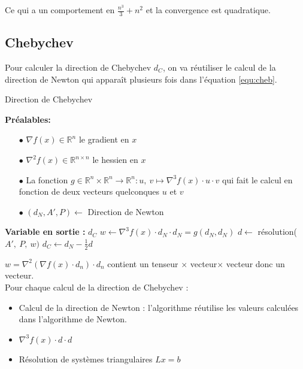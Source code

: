 Ce qui a un comportement en $\frac{n^3}{3}+n^2$ et la convergence est quadratique.


\subsection{Chebychev}

Pour calculer la direction de Chebychev $d_C$, on va r\'eutiliser le calcul
de la direction de Newton qui apparaît plusieurs fois dans l'\'equation \eqref{equ:cheb}. %

\begin{algorithm}                     %
\caption{Direction de Chebychev}          %
\label{alg:3}                           %
\begin{algorithmic}
\STATE \textbf{Pr\'ealables:} %
\begin{itemize}
\item[$\bullet$] $\nabla f(x)\in \mathbb{R}^n$ le gradient en $x$
\item[$\bullet$] $\nabla^2 f(x)\in \mathbb{R}^{n\times n}$ le hessien en $x$
\item[$\bullet$] La fonction $g\in \mathbb{R}^n\times\mathbb{R}^n \rightarrow \mathbb{R}^{n} : u,\ v \mapsto \nabla^3 f(x)\cdot u\cdot v$ qui fait le calcul en fonction
de deux vecteurs quelconques $u$ et $v$
\item[$\bullet$] $(d_N,A',P)\leftarrow$ Direction de Newton
\end{itemize}

\STATE \textbf{Variable en sortie :} $d_C$
\STATE $w \leftarrow \nabla^3 f(x) \cdot d_N \cdot d_N = g(d_N,d_N)$
\STATE $d \leftarrow$ r\'esolution($A',\ P,\ w)$
\STATE $d_C \leftarrow d_N-\frac{1}{2}d$
\end{algorithmic}
\end{algorithm}


 $w=\nabla^2 (\nabla f(x)\cdot d_n)\cdot d_n$ contient un tenseur $\times$ vecteur$\times$ vecteur donc un vecteur.\\

Pour chaque calcul de la direction de Chebychev :
\begin{itemize}
\item Calcul de la direction de Newton : l'algorithme r\'eutilise les valeurs calcul\'ees dans l'algorithme de Newton.
\item $\nabla^3 f(x)\cdot d\cdot d$
\item R\'esolution de syst\`emes triangulaires $Lx=b$
\end{itemize}

